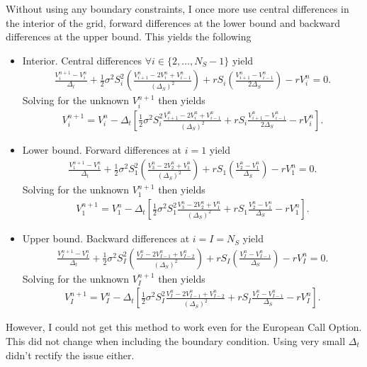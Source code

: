 \documentclass[11pt,a4paper]{article}
\begin{document}
Without using any boundary constraints, I once more use central differences in the interior of the grid, forward differences at the lower bound and backward differences at the upper bound. This yields the following
\begin{itemize}
\item Interior. Central differences $\forall i \in \{2,\ldots,N_S-1\}$ yield
\begin{align*}
\frac{V_i^{n+1} - V_i^n}{\Delta_t} + \frac{1}{2} \sigma^2 S_i^2 \left( \frac{V_{i+1}^n - 2 V_i^n + V_{i-1}^n}{(\Delta_S)^2} \right) + r S_i \left( \frac{V_{i+1}^n - V_{i-1}^n}{2 \Delta_S} \right) - r V_i^n = 0.
\end{align*}
Solving for the unknown $V_{i}^{n+1}$ then yields
\begin{align*}
V_i^{n+1} = V_i^n - \Delta_t \left[ \frac{1}{2} \sigma^2 S_i^2 \frac{V_{i+1}^n - 2 V_i^n + V_{i-1}^n}{(\Delta_S)^2} + r S_i \frac{V_{i+1}^n - V_{i-1}^n}{2 \Delta_S} - r V_i^n \right].
\end{align*}
\item Lower bound. Forward differences at $i=1$ yield
\begin{align*}
\frac{V_1^{n+1} - V_1^n}{\Delta_t} + \frac{1}{2} \sigma^2 S_1^2 \left( \frac{V_3^n - 2 V_2^n + V_1^n}{(\Delta_S)^2} \right) + r S_1 \left( \frac{V_2^n - V_1^n}{\Delta_S} \right) - r V_1^n = 0.
\end{align*}
Solving for the unknown $V_{1}^{n+1}$ then yields
\begin{align*}
V_1^{n+1} = V_1^n - \Delta_t \left[ \frac{1}{2} \sigma^2 S_1^2 \frac{V_3^n - 2 V_2^n + V_1^n}{(\Delta_S)^2} + r S_1 \frac{V_2^n - V_1^n}{\Delta_S} - r V_1^n \right].
\end{align*}
\item Upper bound. Backward differences at $i=I=N_S$ yield
\begin{align*}
\frac{V_I^{n+1} - V_I^n}{\Delta_t} + \frac{1}{2} \sigma^2 S_I^2 \left( \frac{V_I^n - 2 V_{I-1}^n + V_{I-2}^n}{(\Delta_S)^2} \right) + r S_I \left( \frac{V_I^n - V_{I-1}^n}{\Delta_S} \right) - r V_I^n = 0.
\end{align*}
Solving for the unknown $V_{I}^{n+1}$ then yields
\begin{align*}
V_I^{n+1} = V_I^n - \Delta_t \left[ \frac{1}{2} \sigma^2 S_I^2 \frac{V_I^n - 2 V_{I-1}^n + V_{I-2}^n}{(\Delta_S)^2} + r S_I \frac{V_I^n - V_{I-1}^n}{\Delta_S} - r V_I^n \right].
\end{align*}
\end{itemize}
However, I could not get this method to work even for the European Call Option. This did not change when including the boundary condition. Using very small $\Delta_t$ didn't rectify the issue either.
\end{document}

